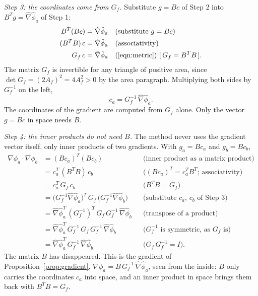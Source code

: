\emph{Step 3: the coordinates come from $G_f$.} Substitute $g = Bc$ of Step 2 into $B^T g = \hat\nabla\hat\phi_a$ of Step 1:
\begin{align*}
B^T (B c) &= \hat\nabla\hat\phi_a && \text{(substitute $g = Bc$)} \\
(B^T B)\, c &= \hat\nabla\hat\phi_a && \text{(associativity)} \\
G_f\, c &= \hat\nabla\hat\phi_a && \text{(\ref{eqn:metric})~[\,$G_f = B^TB$\,].}
\end{align*}
The matrix $G_f$ is invertible for any triangle of positive area, since $\det G_f = (2A_f)^2 = 4 A_f^2 > 0$ by the area paragraph. Multiplying both sides by $G_f^{-1}$ on the left,
\begin{equation*}
c_a = G_f^{-1}\, \hat\nabla\hat\phi_a .
\end{equation*}
The coordinates of the gradient are computed from $G_f$ alone. Only the vector $g = Bc$ in space needs $B$.

\emph{Step 4: the inner products do not need $B$.} The method never uses the gradient vector itself, only inner products of two gradients. With $g_a = B c_a$ and $g_b = B c_b$,
\begin{align*}
\nabla\phi_a \cdot \nabla\phi_b &= (B c_a)^T (B c_b) && \text{(inner product as a matrix product)} \\
&= c_a^T\, (B^T B)\, c_b && \text{($(Bc_a)^T = c_a^TB^T$; associativity)} \\
&= c_a^T\, G_f\, c_b && \text{($B^T B = G_f$)} \\
&= \big(G_f^{-1}\hat\nabla\hat\phi_a\big)^T\, G_f\, \big(G_f^{-1}\hat\nabla\hat\phi_b\big) && \text{(substitute $c_a$, $c_b$ of Step 3)} \\
&= \hat\nabla\hat\phi_a^T\, (G_f^{-1})^T\, G_f\, G_f^{-1}\, \hat\nabla\hat\phi_b && \text{(transpose of a product)} \\
&= \hat\nabla\hat\phi_a^T\, G_f^{-1}\, G_f\, G_f^{-1}\, \hat\nabla\hat\phi_b && \text{($G_f^{-1}$ is symmetric, as $G_f$ is)} \\
&= \hat\nabla\hat\phi_a^T\, G_f^{-1}\, \hat\nabla\hat\phi_b && \text{($G_f\, G_f^{-1} = I$).}
\end{align*}
The matrix $B$ has disappeared. This is the gradient of Proposition~\ref{prop:gradient}, $\nabla\phi_a = B\, G_f^{-1}\, \hat\nabla\hat\phi_a$, seen from the inside: $B$ only carries the coordinates $c_a$ into space, and an inner product in space brings them back with $B^T B = G_f$.


